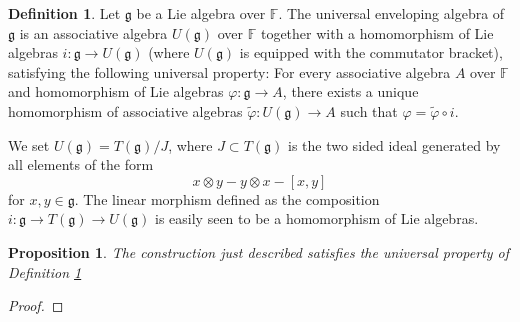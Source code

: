 \documentclass[12pt]{article}
\theoremstyle{plain}
\newtheorem{prop}[thm]{Proposition}
\theoremstyle{definition}
\newtheorem{defn}{Definition}[section]
\numberwithin{equation}{section}
\newcommand{\F}{\mathbb{F}}
\newcommand{\g}{\mathfrak{g}}
\begin{document}
\begin{defn}\label{defn:U(g).univ}
Let $\g$ be a Lie algebra over $\F$. The universal enveloping algebra of $\g$ is an associative algebra $U(\g)$ over $\F$ together with a homomorphism of Lie algebras $i : \g \rightarrow U(\g)$ (where $U(\g)$ is equipped with the commutator bracket), satisfying the following universal property: For every associative algebra $A$ over $\F$ and homomorphism of Lie algebras $\varphi : \g \rightarrow A$, there exists a unique homomorphism of associative algebras $\widetilde\varphi : U(\g) \rightarrow A$ such that $\varphi = \widetilde\varphi \circ i$.
\end{defn}
We set $U(\g) = T(\g) / J$, where $J \subset T(\g)$ is the two sided ideal generated by all elements of the form
\[
x \otimes y - y \otimes x - [x, y]
\]
for $x, y \in \g$. The linear morphism defined as the composition $i : \g \rightarrow T(\g) \rightarrow U(\g)$ is easily seen to be a homomorphism of Lie algebras.
\begin{prop}
The construction just described satisfies the universal property of Definition \ref{defn:U(g).univ}
\end{prop}

\begin{proof}

\end{proof}
\end{document}

